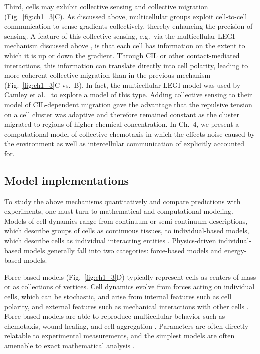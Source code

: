 Third, cells may exhibit collective sensing and collective migration (Fig.\ \ref{fig:ch1_3}C). As discussed above, multicellular groups exploit cell-to-cell communication to sense gradients collectively, thereby enhancing the precision of sensing. A feature of this collective sensing, e.g.\ via the multicellular LEGI mechanism discussed above \cite{ellison2016cell, mugler2016limits}, is that each cell has information on the extent to which it is up or down the gradient. Through CIL or other contact-mediated interactions, this information can translate directly into cell polarity, leading to more coherent collective migration than in the previous mechanism (Fig.\ \ref{fig:ch1_3}C vs.\ B).
In fact, the multicellular LEGI model was used by Camley et al.\ \cite{camley2016emergent} to explore a model of this type. Adding collective sensing to their model of CIL-dependent migration gave the advantage that the repulsive tension on a cell cluster was adaptive and therefore remained constant as the cluster migrated to regions of higher chemical concentration. In Ch.\ 4, we present a computational model of collective chemotaxis in which the effects noise caused by the environment as well as intercellular communication of explicitly accounted for.

\subsection{Model implementations}

To study the above mechanisms quantitatively and compare predictions with experiments, one must turn to mathematical and computational modeling. Models of cell dynamics range from continuum or semi-continuum descriptions, which describe groups of cells as continuous tissues, to individual-based models, which describe cells as individual interacting entities \cite{shao2010computational,maclaren2015models,camley2017physical}.
Physics-driven individual-based models generally fall into two categories: force-based models and energy-based models.

Force-based models (Fig.\ \ref{fig:ch1_3}D) typically represent cells as centers of mass or as collections of vertices. Cell dynamics evolve from forces acting on individual cells, which can be stochastic, and arise from internal features such as cell polarity, and external features such as mechanical interactions with other cells \cite{maclaren2015models}.
Force-based models are able to reproduce multicellular behavior such as chemotaxis, wound healing, and cell aggregation \cite{camley2016emergent,basan2013alignment,janulevicius2015short}. Parameters are often directly relatable to experimental measurements, and the simplest models are often amenable to exact mathematical analysis \cite{camley2016emergent}.

